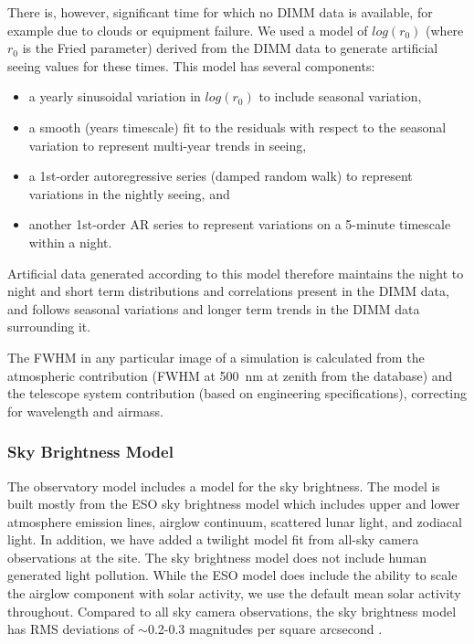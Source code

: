 There is, however, significant time for which no DIMM data is available, for example due to clouds or equipment failure. We used a model of $log(r_{0})$ (where $r_{0}$ is the Fried parameter) derived
from the DIMM data to generate artificial seeing values for these times. This model has several components:
\begin{itemize}
  \item a yearly sinusoidal variation in $log(r_{0})$ to include
    seasonal variation,
  \item a smooth (years timescale) fit to the residuals with respect
    to the seasonal variation to represent multi-year trends in
    seeing,
  \item a 1st-order autoregressive series (damped random walk) to
    represent variations in the nightly seeing, and
  \item another 1st-order AR series to represent variations on a
    5-minute timescale within a night.
\end{itemize}
Artificial data generated according to this model therefore maintains the night to night and short term distributions and correlations present in the DIMM data, and follows seasonal variations and longer term trends in the DIMM data surrounding it. 

The FWHM in any particular image of a simulation is calculated from the atmospheric contribution (FWHM at 500~nm at zenith from the database) and the telescope system contribution (based on engineering specifications), correcting for wavelength and airmass. 

\subsubsection{Sky Brightness Model}

The observatory model includes a model for the sky brightness. The model is built mostly from the ESO sky brightness model which includes upper and lower atmosphere emission lines, airglow continuum, scattered lunar light, and zodiacal light. In addition, we have added a twilight model fit from all-sky camera observations at the site. The sky brightness model does not include human generated light pollution. While the ESO model does include the ability to scale the airglow component with solar activity, we use the default mean solar activity throughout. Compared to all sky camera observations, the sky brightness model has RMS deviations of $\sim$0.2-0.3 magnitudes per square arcsecond \citep{2016SPIE.9910E..1AY}. 

